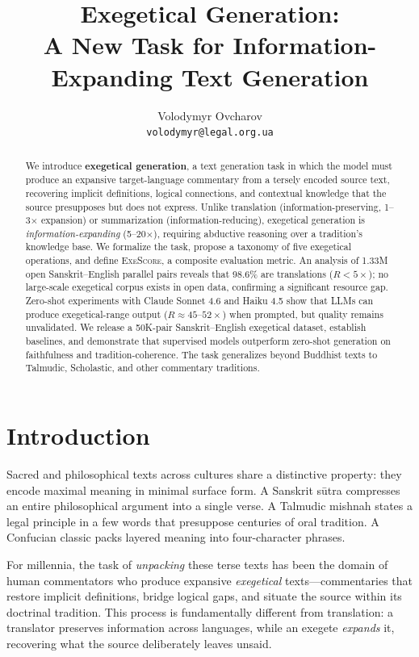 \documentclass[11pt]{article}
\title{Exegetical Generation: \\A New Task for Information-Expanding Text Generation}
\author{Volodymyr Ovcharov \\
  \texttt{volodymyr@legal.org.ua}}
\begin{document}
\maketitle

\begin{abstract}
We introduce \textbf{exegetical generation}, a text generation task in which the model must produce an expansive target-language commentary from a tersely encoded source text, recovering implicit definitions, logical connections, and contextual knowledge that the source presupposes but does not express. Unlike translation (information-preserving, 1--3$\times$ expansion) or summarization (information-reducing), exegetical generation is \textit{information-expanding} (5--20$\times$), requiring abductive reasoning over a tradition's knowledge base. We formalize the task, propose a taxonomy of five exegetical operations, and define \textsc{ExeScore}, a composite evaluation metric. An analysis of 1.33M open Sanskrit--English parallel pairs reveals that 98.6\% are translations ($R < 5\times$); no large-scale exegetical corpus exists in open data, confirming a significant resource gap. Zero-shot experiments with Claude Sonnet 4.6 and Haiku 4.5 show that LLMs can produce exegetical-range output ($R \approx 45\text{--}52\times$) when prompted, but quality remains unvalidated. We release a 50K-pair Sanskrit--English exegetical dataset, establish baselines, and demonstrate that supervised models outperform zero-shot generation on faithfulness and tradition-coherence. The task generalizes beyond Buddhist texts to Talmudic, Scholastic, and other commentary traditions.
\end{abstract}


\section{Introduction}
\label{sec:intro}

Sacred and philosophical texts across cultures share a distinctive property: they encode maximal meaning in minimal surface form. A Sanskrit s\=utra compresses an entire philosophical argument into a single verse. A Talmudic mishnah states a legal principle in a few words that presuppose centuries of oral tradition. A Confucian classic packs layered meaning into four-character phrases.

For millennia, the task of \textit{unpacking} these terse texts has been the domain of human commentators who produce expansive \textit{exegetical} texts---commentaries that restore implicit definitions, bridge logical gaps, and situate the source within its doctrinal tradition. This process is fundamentally different from translation: a translator preserves information across languages, while an exegete \textit{expands} it, recovering what the source deliberately leaves unsaid.
\end{document}
